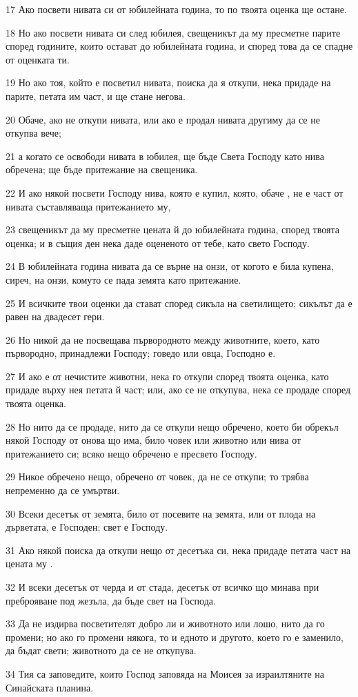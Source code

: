 \par 17 Ако посвети нивата си от юбилейната година, то по твоята оценка ще остане.
\par 18 Но ако посвети нивата си след юбилея, свещеникът да му пресметне парите според годините, които остават до юбилейната година, и според това да се спадне от оценката ти.
\par 19 Но ако тоя, който е посветил нивата, поиска да я откупи, нека придаде на парите, петата им част, и ще стане негова.
\par 20 Обаче, ако не откупи нивата, или ако е продал нивата другиму да се не откупва вече;
\par 21 а когато се освободи нивата в юбилея, ще бъде Света Господу като нива обречена; ще бъде притежание на свещеника.
\par 22 И ако някой посвети Господу нива, която е купил, която, обаче , не е част от нивата съставляваща притежанието му,
\par 23 свещеникът да му пресметне цената й до юбилейната година, според твоята оценка; и в същия ден нека даде оцененото от тебе, като свето Господу.
\par 24 В юбилейната година нивата да се върне на онзи, от когото е била купена, сиреч, на онзи, комуто се пада земята като притежание.
\par 25 И всичките твои оценки да стават според сикъла на светилището; сикълът да е равен на двадесет гери.
\par 26 Но никой да не посвещава първородното между животните, което, като първородно, принадлежи Господу; говедо или овца, Господно е.
\par 27 И ако е от нечистите животни, нека го откупи според твоята оценка, като придаде върху нея петата й част; или, ако се не откупува, нека се продаде според твоята оценка.
\par 28 Но нито да се продаде, нито да се откупи нещо обречено, което би обрекъл някой Господу от онова що има, било човек или животно или нива от притежанието си; всяко нещо обречено е пресвето Господу.
\par 29 Никое обречено нещо, обречено от човек, да не се откупи; то трябва непременно да се умъртви.
\par 30 Всеки десетък от земята, било от посевите на земята, или от плода на дърветата, е Господен; свет е Господу.
\par 31 Ако някой поиска да откупи нещо от десетъка си, нека придаде петата част на цената му .
\par 32 И всеки десетък от черда и от стада, десетък от всичко що минава при преброяване под жезъла, да бъде свет на Господа.
\par 33 Да не издирва посветителят добро ли и животното или лошо, нито да го промени; но ако го промени някога, то и едното и другото, което го е заменило, да бъдат свети; животното да се не откупува.
\par 34 Тия са заповедите, които Господ заповяда на Моисея за израилтяните на Синайската планина.

